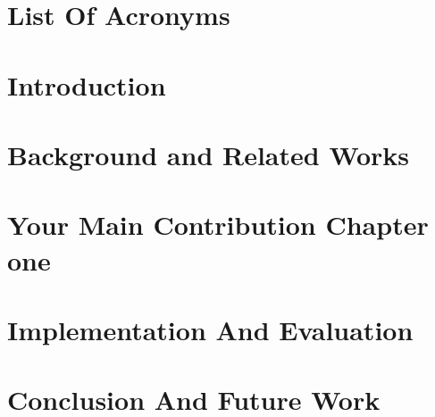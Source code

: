 \documentclass[12pt,english,oneside,letterpaper]{report}
\begin{document}
\tableofcontents

\chapter*{List Of Acronyms}

\clearpage
\listoffigures
\clearpage
\listoftables
\clearpage



\chapter{Introduction}
\label{chap:one}



\chapter{Background and Related Works}
\label{chap:two}


\chapter{Your Main Contribution Chapter one}
\label{chap:three}



\chapter{Implementation And Evaluation}
\label{chap:five}



\chapter{Conclusion And Future Work}
\label{chap:six}


\end{document}
